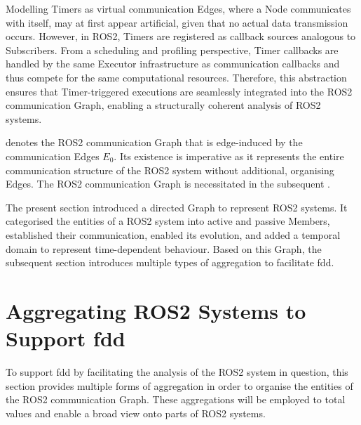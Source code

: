     Modelling Timers as virtual communication Edges, where a Node communicates with itself, may at first appear artificial, given that no actual data transmission occurs.
    However, in ROS2, Timers are registered as callback sources analogous to Subscribers. From a scheduling and profiling perspective, Timer callbacks are handled by the same Executor infrastructure as communication callbacks and thus compete for the same computational resources. Therefore, this abstraction ensures that Timer-triggered executions are seamlessly integrated into the ROS2 communication Graph, enabling a structurally coherent analysis of ROS2 systems.

     denotes the ROS2 communication Graph that is edge-induced by the communication Edges $E_0$. Its existence is imperative as it represents the entire communication structure of the ROS2 system without additional, organising Edges. The ROS2 communication Graph is necessitated in the subsequent .

The present section introduced a directed Graph to represent ROS2 systems. It categorised the entities of a ROS2 system into active and passive Members, established their communication, enabled its evolution, and added a temporal domain to represent time-dependent behaviour.\newline
Based on this Graph, the subsequent section introduces multiple types of aggregation to facilitate \acl{fdd}.


\section{Aggregating ROS2 Systems to Support \acl{fdd}} \label{sec:mathModel:aggregation}
To support \acl{fdd} by facilitating the analysis of the ROS2 system in question, this section provides multiple forms of aggregation in order to organise the entities of the ROS2 communication Graph. These aggregations will be employed to total values and enable a broad view onto parts of ROS2 systems.


